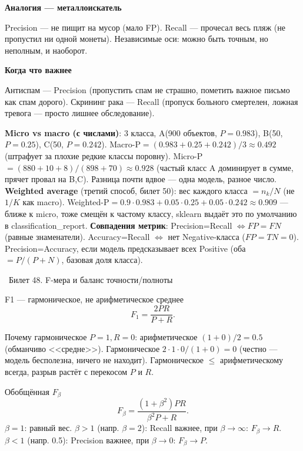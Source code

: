 \documentclass[12pt, a4paper]{article}
\newcommand{\bilet}[2]{%
  \vspace{10pt}%
  \noindent\colorbox{qcolor}{\parbox{\dimexpr\linewidth-2\fboxsep\relax}{%
    \color{white}\large\bfseries\strut\ Билет #1. #2%
  }}%
  \nopagebreak\vspace{5pt}\par\nopagebreak%
}
\newcommand{\qsub}[1]{%
  \vspace{5pt}%
  {\bfseries\color{defblue} #1}%
  \par\vspace{2pt}%
}
\begin{document}
\qsub{Аналогия --- металлоискатель}
Precision --- не пищит на мусор (мало FP). Recall --- прочесал весь пляж (не пропустил ни одной монеты). Независимые оси: можно быть точным, но неполным, и наоборот.

\qsub{Когда что важнее}
Антиспам --- Precision (пропустить спам не страшно, пометить важное письмо как спам дорого). Скрининг рака --- Recall (пропуск больного смертелен, ложная тревога --- просто лишнее обследование).

\begin{fishkabox}
\textbf{Micro vs macro (с числами)}: 3 класса, A(900 объектов, $P{=}0.983$), B(50, $P{=}0.25$), C(50, $P{=}0.242$). Macro-P$=(0.983+0.25+0.242)/3\approx0.492$ (штрафует за плохие редкие классы поровну). Micro-P$=(880{+}10{+}8)/(898{+}70)\approx0.928$ (частый класс A доминирует в сумме, прячет провал на B,C). Разница почти вдвое --- одна модель, разное число.
\textbf{Weighted average} (третий способ, билет 50): вес каждого класса $=n_k/N$ (не $1/K$ как macro). Weighted-P$=0.9{\cdot}0.983+0.05{\cdot}0.25+0.05{\cdot}0.242\approx0.909$ --- ближе к micro, тоже смещён к частому классу, sklearn выдаёт это по умолчанию в classification\_report.
\textbf{Совпадения метрик}: Precision=Recall $\Leftrightarrow FP=FN$ (равные знаменатели). Accuracy=Recall $\Leftrightarrow$ нет Negative-класса ($FP{=}TN{=}0$). Precision=Accuracy, если модель предсказывает всех Positive (оба $=P/(P{+}N)$, базовая доля класса).
\end{fishkabox}

\bilet{48}{F-мера и баланс точности/полноты}

\begin{defbox}{F1 --- гармоническое, не арифметическое среднее}
\[
  F_1 = \frac{2PR}{P+R}.
\]
\end{defbox}

\begin{exbox}{Почему гармоническое}
$P{=}1, R{=}0$: арифметическое $(1{+}0)/2=0.5$ (обманчиво <<средне>>). Гармоническое $2{\cdot}1{\cdot}0/(1{+}0)=0$ (честно --- модель бесполезна, ничего не находит). Гармоническое $\le$ арифметическому всегда, разрыв растёт с перекосом $P$ и $R$.
\end{exbox}

\begin{defbox}{Обобщённая $F_\beta$}
\[
  F_\beta = \frac{(1+\beta^2)PR}{\beta^2 P + R}.
\]
$\beta{=}1$: равный вес. $\beta{>}1$ (напр. $\beta{=}2$): Recall важнее, при $\beta\to\infty$: $F_\beta\to R$. $\beta{<}1$ (напр. 0.5): Precision важнее, при $\beta\to0$: $F_\beta\to P$.
\end{defbox}
\end{document}
